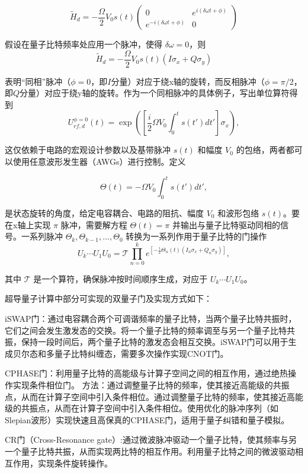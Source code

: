 \[
\tilde{H}_d = -\frac{\Omega}{2} V_0 s(t) \left( \begin{array}{cc} 0 & e^{i(\delta \omega t + \phi)} \\ e^{-i(\delta \omega t + \phi)} & 0 \end{array} \right)
\]

假设在量子比特频率处应用一个脉冲，使得 $\delta \omega = 0$，则
\[
\tilde{H}_d = -\frac{\Omega}{2} V_0 s(t) \left( I \sigma_x + Q \sigma_y \right)
\]

表明“同相”脉冲（$\phi = 0$，即$I$分量）对应于绕x轴的旋转，而反相脉冲（$\phi = \pi/2$，即$Q$分量）对应于绕y轴的旋转。作为一个同相脉冲的具体例子，写出单位算符得到
\[
U_{rf, d}^{\phi=0}(t) = \exp \left( \left[ \frac{i}{2} \Omega V_0 \int_0^t s(t') dt' \right] \sigma_x \right), \tag{92}
\]

这仅依赖于电路的宏观设计参数以及基带脉冲 $s(t)$ 和幅度 $V_0$ 的包络，两者都可以使用任意波形发生器（AWGs）进行控制。定义

\[
\Theta(t) = -\Omega V_0 \int_0^t s(t') dt', \tag{93}
\]

是状态旋转的角度，给定电容耦合、电路的阻抗、幅度 $V_0$ 和波形包络 $s(t)$。要在x轴上实现 $\pi$ 脉冲，需要解方程 $\Theta(t) = \pi$ 并输出与量子比特驱动同相的信号。一系列脉冲 $\Theta_k, \Theta_{k-1}, \ldots, \Theta_0$ 转换为一系列作用于量子比特的门操作
\[
U_k \cdots U_1 U_0 = \mathcal{T} \prod_{n=0}^k e^{\left[-\frac{i}{2} \Theta_n(t)(I_n \sigma_x + Q_n \sigma_y)\right]}, \tag{94}
\]

其中 $\mathcal{T}$ 是一个算符，确保脉冲按时间顺序生成，对应于 $U_k \cdots U_1 U_0$。


超导量子计算中部分可实现的双量子门及实现方式如下：
\begin{paralist}
    \item iSWAP门：通过电容耦合两个可调谐频率的量子比特，当两个量子比特共振时，它们之间会发生激发态的交换。将一个量子比特的频率调至与另一个量子比特共振，保持一段时间后，两个量子比特的激发态会相互交换。iSWAP门可以用于生成贝尔态和多量子比特纠缠态，需要多次操作实现CNOT门。
    \item CPHASE门：利用量子比特的高能级与计算子空间之间的相互作用，通过绝热操作实现条件相位门。
    方法：通过调整量子比特的频率，使其接近高能级的共振点，从而在计算子空间中引入条件相位。通过调整量子比特的频率，使其接近高能级的共振点，从而在计算子空间中引入条件相位。使用优化的脉冲序列（如Slepian波形）实现快速且高保真的CPHASE门，适用于量子纠错和量子模拟。
    \item CR门（Cross-Resonance gate）:通过微波脉冲驱动一个量子比特，使其频率与另一个量子比特共振，从而实现两比特的相互作用。利用量子比特之间的微波驱动相互作用，实现条件旋转操作。 
\end{paralist}

